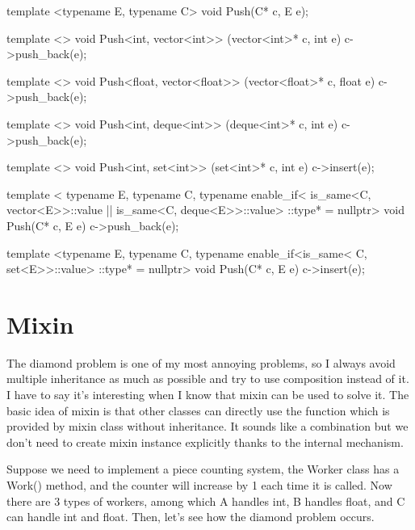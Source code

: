 \documentclass{article}
\begin{document}
\begin{minipage}[t]{0.48\textwidth}
    \begin{CPPCode}
template <typename E, typename C>
void Push(C* c, E e);

template <>
void Push<int, vector<int>>
  (vector<int>* c, int e) {
  c->push_back(e);
}

template <>
void Push<float, vector<float>>
  (vector<float>* c, float e) {
  c->push_back(e);
}

template <>
void Push<int, deque<int>>
  (deque<int>* c, int e) {
  c->push_back(e);
}

template <>
void Push<int, set<int>>
  (set<int>* c, int e) {
  c->insert(e);
}
\end{CPPCode}
\end{minipage}
\begin{minipage}[t]{0.48\textwidth}
\begin{CPPCode}
template <
    typename E, typename C,
    typename enable_if<
        is_same<C, vector<E>>::value ||
        is_same<C, deque<E>>::value>
          ::type* = nullptr>
void Push(C* c, E e) {
  c->push_back(e);
}

template <typename E, typename C,
          typename enable_if<is_same<
              C, set<E>>::value>
            ::type* = nullptr>
void Push(C* c, E e) {
  c->insert(e);
}
\end{CPPCode}
\end{minipage}

\section{Mixin}
The diamond problem is one of my most annoying problems, so I always avoid multiple inheritance as much as possible and try to use composition instead of it. I have to say it's interesting when I know that mixin can be used to solve it. The basic idea of mixin is that other classes can directly use the function which is provided by mixin class without inheritance. It sounds like a combination but we don't need to create mixin instance explicitly thanks to the internal mechanism.

Suppose we need to implement a piece counting system, the Worker class has a Work() method, and the counter will increase by 1 each time it is called. Now there are 3 types of workers, among which A handles int, B handles float, and C can handle int and float. Then, let's see how the diamond problem occurs.
\end{document}
